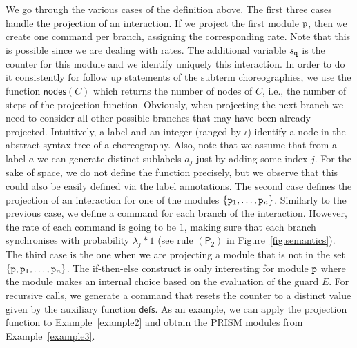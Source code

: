     We go through the various cases of the definition above. The first
    three cases handle the projection of an interaction. If we project
    the first module $\mathtt{p}$, then we create one command per branch,
    assigning the corresponding rate. Note that this is possible since
    we are dealing with rates. The additional variable $s_{\mathtt{q}}$
    is the counter for this module and we identify uniquely this
    interaction. In order to do it consistently for follow up
    statements of the subterm choreographies, we use the function
    $\mathsf{nodes}(C)$ which returns the number of nodes of $C$,
    i.e., the number of steps of the projection function. Obviously,
    when projecting the next branch we need to consider all other
    possible branches that may have been already
    projected. Intuitively, a label and an integer (ranged by $\iota$)
    identify a node in the abstract syntax tree of a
    choreography. Also, note that we assume that from a label $a$ we
    can generate distinct sublabels $a_j$ just by adding some index
    $j$. For the sake of space, we do not define the function
    precisely, but we observe that this could also be easily defined
    via the label annotations. The second case defines the projection
    of an interaction for one of the modules
    $\{\mathtt{p}_1,\ldots,\mathtt{p}_n\}$. Similarly to the previous case,
    we define a command for each branch of the interaction. However,
    the rate of each command is going to be $1$, making sure that each
    branch synchronises with probability $\lambda_j*1$ (see rule
    $\mathsf{(P_2)}$ in Figure~\ref{fig:semantics}).
    The third case is the one when we are projecting a module that is
    not in the set $\{\mathtt{p}, \mathtt{p}_1,\ldots,\mathtt{p}_n\}$. %
    The if-then-else construct is only interesting for module
    $\mathtt{p}$ where the module makes an internal choice based on the
    evaluation of the guard $E$. %
    For recursive calls, we generate a command that resets the counter
    to a distinct value given by the auxiliary function
    $\textsf{defs}$. As an example, we can apply the projection
    function to Example~\ref{example2} and obtain the PRISM modules
    from Example~\ref{example3}.

